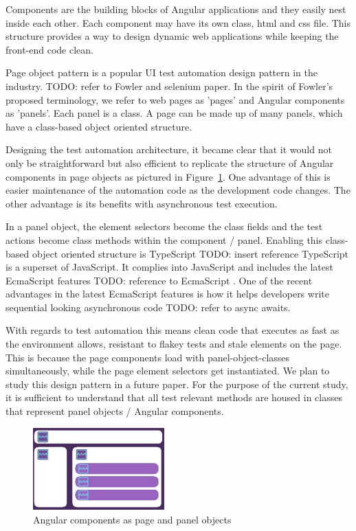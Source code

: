 \documentclass[conference]{IEEEtran}
\newcommand{\todo}[1]{}
\renewcommand{\todo}[1]{{\color{red} TODO: {#1}}}
\begin{document}
	Components are the building blocks of Angular applications and they easily nest inside each other.
	Each component may have its own class, html and css file. This structure provides a way to design dynamic web applications while keeping the front-end code clean. 

	Page object pattern is a popular UI test automation design pattern in the industry. \todo{refer to Fowler and selenium paper}.
	In the spirit of Fowler's proposed terminology, we refer to web pages as 'pages' and Angular components as 'panels'.
	Each panel is a class. A page can be made up of many panels, which have a class-based object oriented structure.   

	Designing the test automation architecture, it became clear that it would not only be straightforward but also efficient to replicate the structure of Angular components in page objects as pictured in Figure~\ref{fig:angular}.
	One advantage of this is easier maintenance of the automation code as the development code changes.
	The other advantage is its benefits with asynchronous test execution.

	In a panel object, the element selectors become the class fields and the test actions become class methods within the component / panel.
	Enabling this class-based object oriented structure is TypeScript \todo{insert reference}
	TypeScript is a superset of JavaScript. It complies into JavaScript and includes the latest EcmaScript features \todo{reference to EcmaScript} .
	One of the recent advantages in the latest EcmaScript features is how it helps developers write sequential looking asynchronous code \todo{refer to async awaits}.

	With regards to test automation this means clean code that executes as fast as the environment allows, resistant to flakey tests and stale elements on the page. 
	This is because the page components load with panel-object-classes simultaneously, while the page element selectors get instantiated.
	We plan to study this design pattern in a future paper. For the purpose of the current study, it is sufficient to understand that all test relevant methods are housed in classes that represent panel objects / Angular components.
	
	\begin{figure}[!h]
		\includegraphics[width=0.45\textwidth,]{angular.pdf}
	\caption{Angular components as page and panel objects}
	\label{fig:angular}
	\end{figure}
\end{document}
